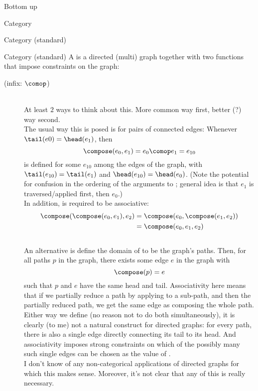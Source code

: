 \begin{plSection}{Bottom up}
\begin{plSection}{Category}
\begin{plSection}{Category (standard)}
\begin{plDefinition}{Category (standard)}{}
A  is a directed (multi) graph 
together with two functions that impose constraints
on the graph:
\begin{description}
\item[\compose \textrm{\textup{(infix: $\comop$)}}]\mbox{}\\
At least $2$ ways to think about this. 
More common way first, better (?) way second.\\
The usual way this is posed is for pairs of connected edges:
Whenever $\tail(e0) = \head(e_1)$,
then
\[ \compose(e_0,e_1) = e_0 \comop e_1 = e_{10} \]
is defined
for some $e_{10}$ among the edges of the graph,
with $\tail(e_{10}) = \tail(e_1)$
and $\head(e_{10}) = \head(e_0)$.
(Note the potential for confusion 
in the ordering of the arguments to \compose;
general idea is that $e_1$ is traversed/applied first,
then $e_0$.) \\
In addition, \compose is required to be associative:
\begin{align*}
\compose(\compose(e_0,e_1),e_2) 
&
= \compose(e_0,\compose(e_1,e_2))
\\
&
= \compose(e_0,e_1,e_2)
\end{align*}
\\
An alternative is define the domain of \compose
to be the graph's paths. 
Then, for all paths $p$ in the graph,
there exists some edge $e$ in the graph
with 
\begin{equation*}
\compose(p) = e
\end{equation*} 
such that 
$p$ and $e$ have the same head and tail.
Associativity here means that if we partially reduce a path
by applying \compose to a sub-path,
and then \compose the partially reduced path,
we get the same edge as composing the whole path.
\\
Either way we define \compose (no reason not to do both
simultaneously), it is clearly (to me) not a natural construct
for directed graphs: for every path, there is also 
a single edge directly connecting its tail to its head.
And associativity imposes strong constraints on which of the possibly
many such single edges can be chosen as the value of \compose.
\\
I don't know of any non-categorical applications of directed graphs
for which this makes sense.
Moreover, it's not clear that any of this is really necessary.
\\
\item[\identity]\mbox{}\\

\end{description}
\end{plDefinition}
\end{plSection}
\end{plSection}
\end{plSection}
